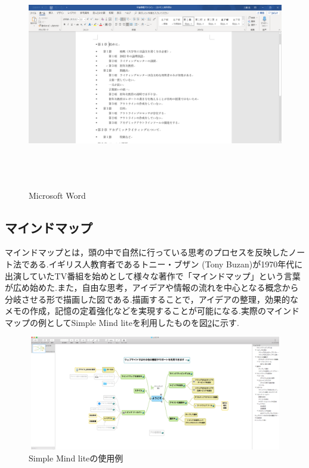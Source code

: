 \documentclass[a4j,12pt]{jarticle}
\begin{document}
\begin{figure}[H]
\begin{center}
 \includegraphics[clip,width=130mm,height=100mm]{word.png}
 \end{center}
 \caption{Microsoft Word}
 \label{fig:d}
\end{figure}

\newpage
\subsection{マインドマップ}
マインドマップとは，頭の中で自然に行っている思考のプロセスを反映したノート法である.イギリス人教育者であるトニー・ブザン (Tony Buzan)が1970年代に出演していたTV番組を始めとして様々な著作で「マインドマップ」という言葉が広め始めた\cite{ren4}.また，自由な思考，アイデアや情報の流れを中心となる概念から分岐させる形で描画した図である.描画することで，アイデアの整理，効果的なメモの作成，記憶の定着強化などを実現することが可能になる.実際のマインドマップの例としてSimple Mind liteを利用したものを図\ref{fig:e}に示す.
\begin{figure}[h]
\begin{center}
 \includegraphics[clip,width=130mm,height=50mm]{maindmap.png}
\end{center}
 \caption{Simple Mind liteの使用例}
 \label{fig:e}
\end{figure}
\newpage
\end{document}

